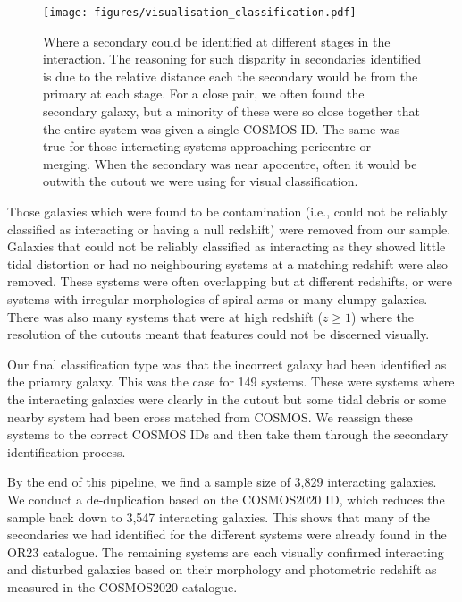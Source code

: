 \documentclass[fleqn,usenatbib]{mnras}
\begin{document}
\begin{figure}
    \centering
    \texttt{[image: figures/visualisation\_classification.pdf]}
    \caption{Where a secondary could be identified at different stages in the interaction. The reasoning for such disparity in secondaries identified is due to the relative distance each the secondary would be from the primary at each stage. For a close pair, we often found the secondary galaxy, but a minority of these were so close together that the entire system was given a single COSMOS ID. The same was true for those interacting systems approaching pericentre or merging. When the secondary was near apocentre, often it would be outwith the cutout we were using for visual classification.}
    \label{fig:secondaries_found}
\end{figure}

Those galaxies which were found to be contamination (i.e., could not be reliably classified as interacting or having a null redshift) were removed from our sample. Galaxies that could not be reliably classified as interacting as they showed little tidal distortion or had no neighbouring systems at a matching redshift were also removed. These systems were often overlapping but at different redshifts, or were systems with irregular morphologies of spiral arms or many clumpy galaxies. There was also many systems that were at high redshift ($z \geq 1$) where the resolution of the cutouts meant that features could not be discerned visually.

Our final classification type was that the incorrect galaxy had been identified as the priamry galaxy. This was the case for 149 systems. These were systems where the interacting galaxies were clearly in the cutout but some tidal debris or some nearby system had been cross matched from COSMOS. We reassign these systems to the correct COSMOS IDs and then take them through the secondary identification process.

By the end of this pipeline, we find a sample size of 3,829 interacting galaxies. We conduct a de-duplication based on the COSMOS2020 ID, which reduces the sample back down to 3,547 interacting galaxies. This shows that many of the secondaries we had identified for the different systems were already found in the OR23 catalogue. The remaining systems are each visually confirmed interacting and disturbed galaxies based on their morphology and photometric redshift as measured in the COSMOS2020 catalogue.
\end{document}
